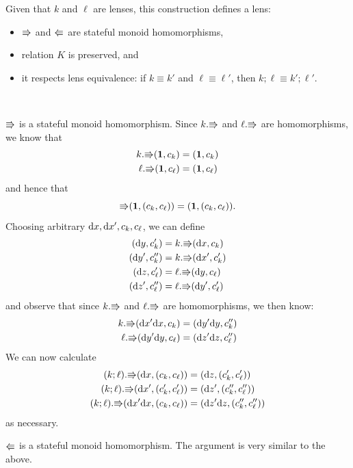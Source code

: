 \iffull
\begin{lemma}
    Given that $k$ and $\ell$ are lenses, this construction defines a lens:
    \begin{itemize}
        \item $\mathord{\Rrightarrow}$ and $\mathord{\Lleftarrow}$ are stateful monoid homomorphisms,
        \item relation $K$ is preserved, and
        \item it respects lens equivalence: if $k \equiv k'$ and
            $\ell\equiv\ell'$, then $k;\ell \equiv k';\ell'$.
    \end{itemize}
    \label{composition-goodlens}
\end{lemma}
\begin{pf}\ 

  $\mathord{\Rrightarrow}$ is a stateful monoid homomorphism. Since $k.\mathord{\Rrightarrow}$ and
  $\ell.\mathord{\Rrightarrow}$ are homomorphisms, we know that
  \begin{align*}
      k.\mathord{\Rrightarrow}(\mbox{\bf{1}},c_k) &= (\mbox{\bf{1}},c_k) \\
      \ell.\mathord{\Rrightarrow}(\mbox{\bf{1}},c_\ell) &= (\mbox{\bf{1}},c_\ell)
  \end{align*}
  and hence that
  \[\mathord{\Rrightarrow}(\mbox{\bf{1}},(c_k,c_\ell))=(\mbox{\bf{1}},(c_k,c_\ell)).\]
  Choosing arbitrary $\textrm{d} x,\textrm{d} x',c_k,c_\ell$, we can define
  \begin{align*}
      (\textrm{d} y,c_k') &= k.\mathord{\Rrightarrow}(\textrm{d} x,c_k) \\
      (\textrm{d} y',c_k'') &= k.\mathord{\Rrightarrow}(\textrm{d} x',c_k') \\
      (\textrm{d} z,c_\ell') &= \ell.\mathord{\Rrightarrow}(\textrm{d} y,c_\ell) \\
      (\textrm{d} z',c_\ell'') &= \ell.\mathord{\Rrightarrow}(\textrm{d} y',c_\ell')
  \end{align*}
  and observe that since $k.\mathord{\Rrightarrow}$ and $\ell.\mathord{\Rrightarrow}$ are homomorphisms, we
  then know:
  \begin{align*}
      k.\mathord{\Rrightarrow}(\textrm{d} x'\textrm{d} x,c_k) &= (\textrm{d} y'\textrm{d} y,c_k'') \\
      \ell.\mathord{\Rrightarrow}(\textrm{d} y'\textrm{d} y,c_\ell) &= (\textrm{d} z'\textrm{d} z,c_\ell'')
  \end{align*}
  We can now calculate
  \begin{align*}
      (k;\ell).\mathord{\Rrightarrow}(\textrm{d} x,(c_k,c_\ell)) &= (\textrm{d} z,(c_k',c_\ell')) \\
      (k;\ell).\mathord{\Rrightarrow}(\textrm{d} x',(c_k',c_\ell')) &= (\textrm{d} z',(c_k'',c_\ell'')) \\
      (k;\ell).\mathord{\Rrightarrow}(\textrm{d} x'\textrm{d} x,(c_k,c_\ell)) &= (\textrm{d} z'\textrm{d} z,(c_k'',c_\ell''))
  \end{align*}
  as necessary.

  $\mathord{\Lleftarrow}$ is a stateful monoid homomorphism. The argument is very similar
  to the above.


\end{pf}
